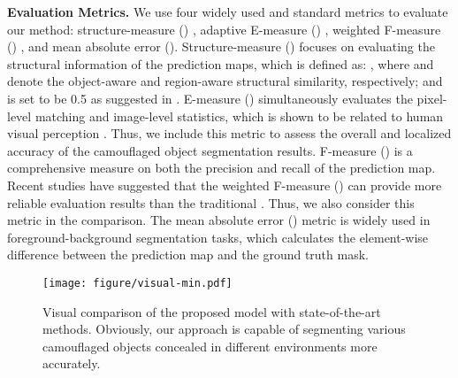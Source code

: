 \documentclass[final]{cvpr}
\begin{document}
\noindent \textbf{Evaluation Metrics.}
We use four widely used and standard metrics to evaluate our method: structure-measure () \cite{fan2017structure_smeasure}, adaptive E-measure () \cite{fan2018enhanced_emeasure}, weighted F-measure () \cite{margolin2014evaluate_wfmeasure}, and mean absolute error ().
Structure-measure () focuses on evaluating the structural information of the prediction maps, which is defined as: , where  and  denote the object-aware and region-aware structural similarity, respectively; and  is set to be 0.5 as suggested in \cite{fan2017structure_smeasure}.
E-measure () simultaneously evaluates the pixel-level matching and image-level statistics, which is shown to be related to human visual perception \cite{fan2018enhanced_emeasure}. Thus, we include this metric to assess the overall and localized accuracy of the camouflaged object segmentation results.
F-measure () is a comprehensive measure on both the precision and recall of the prediction map. Recent studies \cite{fan2017structure_smeasure,fan2018enhanced_emeasure} have suggested that the weighted F-measure () \cite{margolin2014evaluate_wfmeasure} can provide more reliable evaluation results than the traditional . Thus, we also consider this metric in the comparison.
The mean absolute error () metric is widely used in foreground-background segmentation tasks, which calculates the element-wise difference between the prediction map and the ground truth mask.

\begin{figure*}[t]
	\begin{center}
		\texttt{[image: figure/visual-min.pdf]}
	\end{center}
\caption{Visual comparison of the proposed model with state-of-the-art methods. Obviously, our approach is capable of segmenting various camouflaged objects concealed in different environments more accurately.}
	\label{fig:visual}
\end{figure*}
\end{document}
